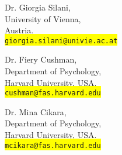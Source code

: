 \documentclass[10pt]{article}
\begin{document}
	\parbox[c]{2.2in}{
	Dr. Giorgia Silani,\\
	University of Vienna,\\
	Austria.\\
	{\tt \colorbox{yellow}{giorgia.silani@univie.ac.at}}
	}
	\parbox[c]{2.2in}{
	Dr. Fiery Cushman,\\
	Department of Psychology,\\
	Harvard University, USA.\\
	{\tt \colorbox{yellow}{cushman@fas.harvard.edu}}
	}
	\parbox[c]{2.2in}{
	Dr. Mina Cikara,\\
	Department of Psychology,\\
	Harvard University, USA.\\
	{\tt \colorbox{yellow}{mcikara@fas.harvard.edu}}
	}
	
	

    
    
    
\end{document}
